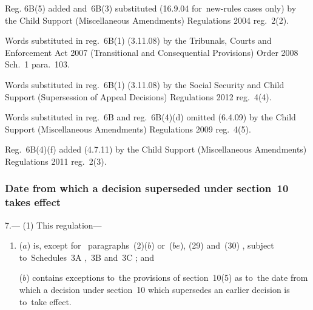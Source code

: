 \documentclass[12pt,a4paper]{article}
\begin{document}
{{Reg. 6B(5) added and~6B(3) substituted (16.9.04 for~new-rules cases only) by the Child Support (Miscellaneous Amendments) Regulations 2004 reg.~2(2).

Words substituted in reg.~6B(1) (3.11.08) by the Tribunals, Courts and Enforcement Act 2007 (Transitional and Consequential Provisions) Order 2008 Sch.~1 para.~103.

Words substituted in reg.~6B(1) (3.11.08) by the Social Security and Child Support (Supersession of Appeal Decisions) Regulations 2012 reg.~4(4).

Words substituted in reg.~6B and reg.~6B(4)(d) omitted (6.4.09) by the Child Support (Miscellaneous Amendments) Regulations 2009 reg.~4(5).

Reg.~6B(4)(f) added (4.7.11) by the Child Support (Miscellaneous Amendments) Regulations 2011 reg.~2(3).
}
}

\subsubsection[7. Date from which a decision superseded under section~10 takes effect]{Date from which a decision superseded under section~10 takes effect}

7.—%
%
(1) This regulation---
\begin{enumerate}\item[]


($a$) is, except for~
paragraphs~(2)($b$)
or~($be$), (29) and~(30)%
, subject to~Schedules~3A%
,~3B and~3C%
; and

($b$) contains exceptions to~the provisions of section~10(5) as to~the date from which a decision under section~10 which supersedes an earlier decision is to~take effect.
\end{enumerate}
\end{document}
